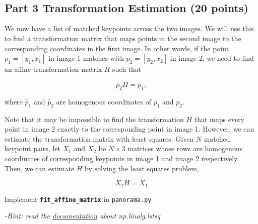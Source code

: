 \documentclass[11pt]{article}
\begin{document}
    \begin{center}
    \end{center}
    { \hspace*{\fill} \\}
    
    \begin{center}
    \end{center}
    { \hspace*{\fill} \\}
    
    \subsection{Part 3 Transformation Estimation (20
points)}\label{part-3-transformation-estimation-20-points}

We now have a list of matched keypoints across the two images. We will
use this to find a transformation matrix that maps points in the second
image to the corresponding coordinates in the first image. In other
words, if the point \(p_1 = [y_1,x_1]\) in image 1 matches with
\(p_2=[y_2, x_2]\) in image 2, we need to find an affine transformation
matrix \(H\) such that

\[
\tilde{p_2}H = \tilde{p_1},
\]

where \(\tilde{p_1}\) and \(\tilde{p_2}\) are homogenous coordinates of
\(p_1\) and \(p_2\).

Note that it may be impossible to find the transformation \(H\) that
maps every point in image 2 exactly to the corresponding point in image
1. However, we can estimate the transformation matrix with least
squares. Given \(N\) matched keypoint pairs, let \(X_1\) and \(X_2\) be
\(N \times 3\) matrices whose rows are homogenous coordinates of
corresponding keypoints in image 1 and image 2 respectively. Then, we
can estimate \(H\) by solving the least squares problem,

\[
X_2 H = X_1
\]

Implement \textbf{\texttt{fit\_affine\_matrix}} in \texttt{panorama.py}

\emph{-Hint: read the
\href{https://docs.scipy.org/doc/numpy/reference/generated/numpy.linalg.lstsq.html}{documentation}
about np.linalg.lstsq}
\end{document}
